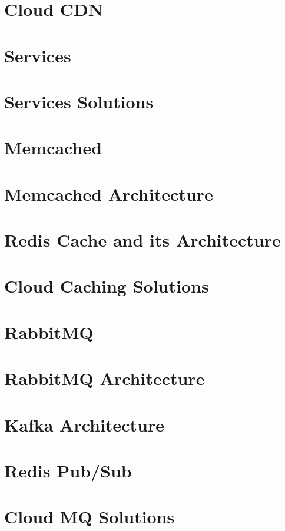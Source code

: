 \documentclass[11pt]{article}
\begin{document}
\section{Cloud CDN}
    
\section{Services}
    
\section{Services Solutions}
    
\section{Memcached}
    
\section{Memcached Architecture}
    
\section{Redis Cache and its Architecture}
    
\section{Cloud Caching Solutions}
    
\section{RabbitMQ}
    
\section{RabbitMQ Architecture}
    
\section{Kafka Architecture}
    
\section{Redis Pub/Sub}
    
\section{Cloud MQ Solutions}
    
\end{document}
